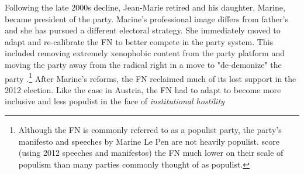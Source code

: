 \documentclass[a4paper,12pt]{article}\usepackage[]{graphicx}\usepackage[]{color}
\begin{document}
Following the late 2000s decline, Jean-Marie retired and his daughter, Marine, became president of the party. Marine's professional image differs from father's and she has pursued a different electoral strategy. She immediately moved to adapt and re-calibrate the FN to better compete in the party system. This included removing extremely xenophobic content from the party platform and moving the party away from the radical right \citep{shields2013marine} in a move to "de-demonize" the party \citep{mayer2013jean}.\footnote{ Although the FN is commonly referred to as a populist party, the party's manifesto and speeches by Marine Le Pen are not heavily populist. \citet{hawkins2015mapping} score (using 2012 speeches and manifestos) the FN much lower on their scale of populism than many parties commonly thought of as populist.} After Marine's reforms, the FN reclaimed much of its lost support in the 2012 election. Like the case in Austria, the FN had to adapt to become more inclusive and less populist in the face of \textit{institutional hostility}
\par
\end{document}
